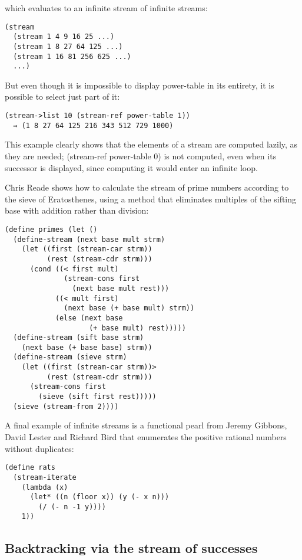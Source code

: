 which evaluates to an infinite stream of infinite streams:

\begin{verbatim}
(stream
  (stream 1 4 9 16 25 ...)
  (stream 1 8 27 64 125 ...)
  (stream 1 16 81 256 625 ...)
  ...)
\end{verbatim}

But even though it is impossible to display power-table in its entirety,
it is possible to select just part of it:

\begin{verbatim}
(stream->list 10 (stream-ref power-table 1))
  ⇒ (1 8 27 64 125 216 343 512 729 1000)
\end{verbatim}

This example clearly shows that the elements of a stream are computed
lazily, as they are needed; (stream-ref power-table 0) is not computed,
even when its successor is displayed, since computing it would enter an
infinite loop.

Chris Reade shows how to calculate the stream of prime numbers according
to the sieve of Eratosthenes, using a method that eliminates multiples
of the sifting base with addition rather than division:

\begin{verbatim}
(define primes (let ()
  (define-stream (next base mult strm)
    (let ((first (stream-car strm))
          (rest (stream-cdr strm)))
      (cond ((< first mult)
              (stream-cons first
                (next base mult rest)))
            ((< mult first)
              (next base (+ base mult) strm))
            (else (next base
                    (+ base mult) rest)))))
  (define-stream (sift base strm)
    (next base (+ base base) strm))
  (define-stream (sieve strm)
    (let ((first (stream-car strm))>
          (rest (stream-cdr strm)))
      (stream-cons first
        (sieve (sift first rest)))))
  (sieve (stream-from 2))))
\end{verbatim}

A final example of infinite streams is a functional pearl from Jeremy
Gibbons, David Lester and Richard Bird that enumerates the positive
rational numbers without duplicates:

\begin{verbatim}
(define rats
  (stream-iterate
    (lambda (x)
      (let* ((n (floor x)) (y (- x n)))
        (/ (- n -1 y))))
    1))
\end{verbatim}

\subsection{Backtracking via the stream of
successes}\label{backtracking-via-the-stream-of-successes}


